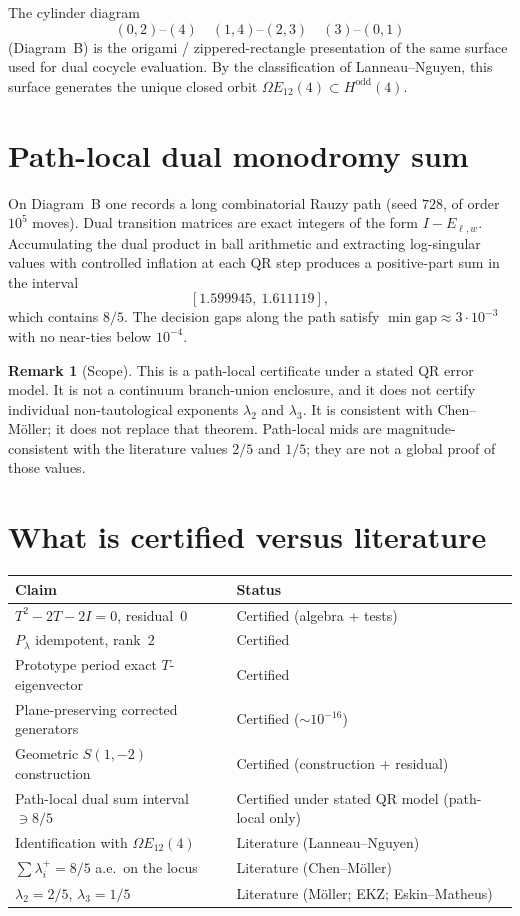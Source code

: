 \documentclass[11pt,a4paper]{article}
\theoremstyle{definition}
\newtheorem{remark}{Remark}
\begin{document}
The cylinder diagram
\[
(0,2)\text{--}(4)\quad(1,4)\text{--}(2,3)\quad(3)\text{--}(0,1)
\]
(Diagram~B) is the origami / zippered-rectangle presentation of the same surface used for dual cocycle evaluation.
By the classification of Lanneau--Nguyen, this surface generates the unique closed orbit $\Omega E_{12}(4)\subset H^{\mathrm{odd}}(4)$.

\section{Path-local dual monodromy sum}

On Diagram~B one records a long combinatorial Rauzy path (seed $728$, of order $10^5$ moves).
Dual transition matrices are exact integers of the form $I-E_{\ell,w}$.
Accumulating the dual product in ball arithmetic and extracting log-singular values with controlled inflation at each QR step produces a positive-part sum in the interval
\[
[1.599945,\ 1.611119],
\]
which contains $8/5$.
The decision gaps along the path satisfy $\min\mathrm{gap}\approx3\cdot10^{-3}$ with no near-ties below $10^{-4}$.

\begin{remark}[Scope]
This is a path-local certificate under a stated QR error model.
It is not a continuum branch-union enclosure, and it does not certify individual non-tautological exponents $\lambda_2$ and $\lambda_3$.
It is consistent with Chen--M\"oller; it does not replace that theorem.
Path-local mids are magnitude-consistent with the literature values $2/5$ and $1/5$; they are not a global proof of those values.
\end{remark}

\section{What is certified versus literature}

\begin{center}
\begin{tabular}{@{}ll@{}}
\toprule
\textbf{Claim} & \textbf{Status} \\
\midrule
$T^2-2T-2I=0$, residual~$0$ & Certified (algebra + tests) \\
$P_\lambda$ idempotent, rank~$2$ & Certified \\
Prototype period exact $T$-eigenvector & Certified \\
Plane-preserving corrected generators & Certified ($\sim10^{-16}$) \\
Geometric $S(1,-2)$ construction & Certified (construction + residual) \\
Path-local dual sum interval $\ni 8/5$ & Certified under stated QR model (path-local only) \\
Identification with $\Omega E_{12}(4)$ & Literature (Lanneau--Nguyen) \\
$\sum\lambda_i^+=8/5$ a.e.\ on the locus & Literature (Chen--M\"oller) \\
$\lambda_2=2/5$, $\lambda_3=1/5$ & Literature (M\"oller; EKZ; Eskin--Matheus) \\
\bottomrule
\end{tabular}
\end{center}
\end{document}
